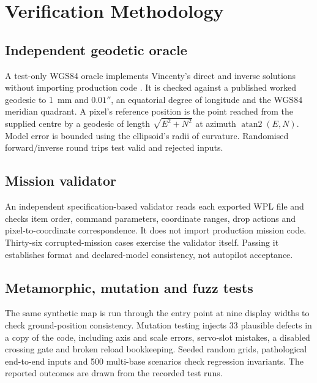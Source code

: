 \section{Verification Methodology}
\label{sec:verif}

\subsection{Independent geodetic oracle}
A test-only WGS84 oracle implements Vincenty's direct and inverse solutions without importing production code \cite{vincenty1975direct}. It is checked against a published worked geodesic to 1~mm and $0.01''$, an equatorial degree of longitude and the WGS84 meridian quadrant. A pixel's reference position is the point reached from the supplied centre by a geodesic of length $\sqrt{E^2+N^2}$ at azimuth $\operatorname{atan2}(E,N)$. Model error is bounded using the ellipsoid's radii of curvature. Randomised forward/inverse round trips test valid and rejected inputs.

\subsection{Mission validator}
An independent specification-based validator reads each exported WPL file and checks item order, command parameters, coordinate ranges, drop actions and pixel-to-coordinate correspondence. It does not import production mission code. Thirty-six corrupted-mission cases exercise the validator itself. Passing it establishes format and declared-model consistency, not autopilot acceptance.

\subsection{Metamorphic, mutation and fuzz tests}
The same synthetic map is run through the entry point at nine display widths to check ground-position consistency. Mutation testing injects 33 plausible defects in a copy of the code, including axis and scale errors, servo-slot mistakes, a disabled crossing gate and broken reload bookkeeping. Seeded random grids, pathological end-to-end inputs and 500 multi-base scenarios check regression invariants. The reported outcomes are drawn from the recorded test runs.


